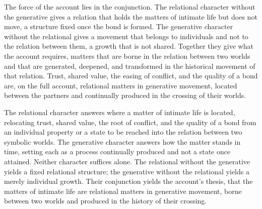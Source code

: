 The force of the account lies in the conjunction. The relational character without the generative gives a relation that holds the matters of intimate life but does not move, a structure fixed once the bond is formed. The generative character without the relational gives a movement that belongs to individuals and not to the relation between them, a growth that is not shared. Together they give what the account requires, matters that are borne in the relation between two worlds and that are generated, deepened, and transformed in the historical movement of that relation. Trust, shared value, the easing of conflict, and the quality of a bond are, on the full account, relational matters in generative movement, located between the partners and continually produced in the crossing of their worlds.

\begin{claim}
The relational character answers where a matter of intimate life is located, relocating trust, shared value, the root of conflict, and the quality of a bond from an individual property or a state to be reached into the relation between two symbolic worlds. The generative character answers how the matter stands in time, setting each as a process continually produced and not a state once attained. Neither character suffices alone. The relational without the generative yields a fixed relational structure; the generative without the relational yields a merely individual growth. Their conjunction yields the account's thesis, that the matters of intimate life are relational matters in generative movement, borne between two worlds and produced in the history of their crossing.
\end{claim}

